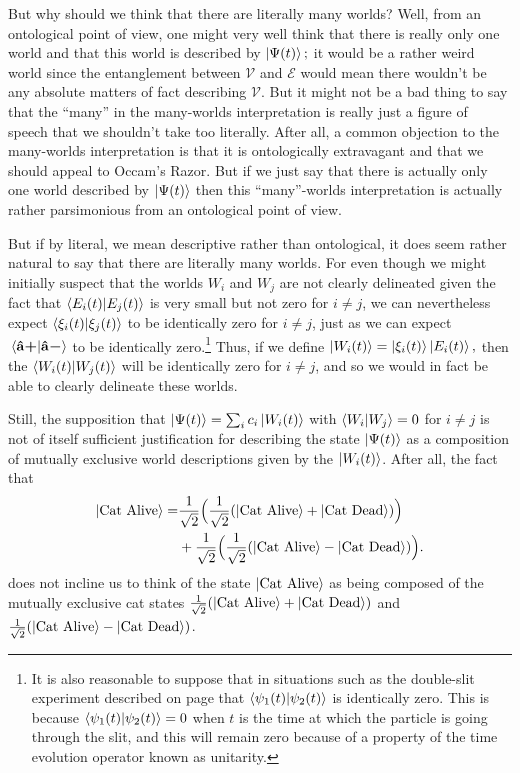     But why should we think that there are literally many worlds? Well, from an ontological point of view, one might very well think that there is really only one world and that this world is described by $\ket{\Psi(t)};$ it would be a rather weird world since the entanglement between $\mathcal{V}$ and $\mathcal{E}$ would mean there wouldn't be any absolute matters of fact describing $\mathcal{V}$. But it might not be a bad thing to say that the ``many'' in the many-worlds interpretation is really just a figure of speech that we shouldn't take too literally. After all, a common objection to the many-worlds interpretation is that it is ontologically extravagant and that we should appeal to Occam's Razor. But if we just say that there is actually only one world described by $\ket{\Psi(t)}$ then this ``many''-worlds interpretation is actually rather parsimonious from an ontological point of view. 
    
    But if by literal, we mean descriptive rather than ontological, it does seem rather natural to say that there are literally many worlds. For even though we might initially suspect that the worlds $W_i$ and $W_j$ are not clearly delineated given the fact that $\ip{E_i(t)}{E_j(t)}$ is very small but not zero for $i\neq j$, we can nevertheless expect $\ip{\xi_i(t)}{\xi_j(t)}$ to be identically zero for $i\neq j$, just as we can expect $\ip*{\uvbp{a}}{\uvbm{a}}$ to be identically zero.\footnote{It is also reasonable to suppose that in situations such as the double-slit experiment described on page \pageref{psi_slit} that $\ip{\psi_1(t)}{\psi_2(t)}$ is identically zero. This is because $\ip{\psi_1(t)}{\psi_2(t)}=0$ when $t$ is the time at which the particle is going through the slit, and this will remain zero because of a property of the time evolution operator known as unitarity.} Thus, if we define $\ket{W_i(t)}=\ket{\xi_i(t)}\ket{E_i(t)},$ then the $\ip{W_i(t)}{W_j(t)}$ will be identically zero for $i\neq j$, and so we would in fact be able to clearly delineate these worlds.
    
    Still, the supposition that $\ket{\Psi(t)}= \sum_i c_i\ket{W_i(t)}$  with $\ip{W_i}{W_j}=0$ for $i\neq j$ is not of itself sufficient justification for describing the state $\ket{\Psi(t)}$ as a composition of mutually exclusive world descriptions given by the $\ket{W_i(t)}$. After all, the fact that
    \begin{align*}\ket{\text{Cat Alive}}= &\frac{1}{\sqrt{2}}\Big(\frac{1}{\sqrt{2}}(\ket{\text{Cat Alive}}+\ket{\text{Cat Dead}})\Big)\\&+\frac{1}{\sqrt{2}}\Big( \frac{1}{\sqrt{2}}(\ket{\text{Cat Alive}}-\ket{\text{Cat Dead}})\Big). \end{align*} does not incline us to think of the state $\ket{\text{Cat Alive}}$ as being composed of the mutually exclusive cat states  $\frac{1}{\sqrt{2}}(\ket{\text{Cat Alive}}+\ket{\text{Cat Dead}})$ and $\frac{1}{\sqrt{2}}(\ket{\text{Cat Alive}}-\ket{\text{Cat Dead}})$. 
    
